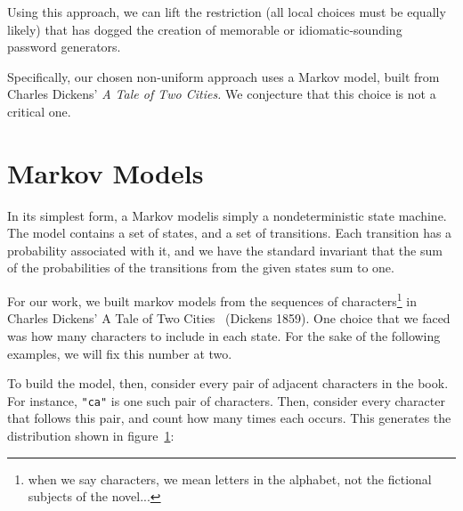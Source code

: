\documentclass[preprint]{soups}
\newcommand{\sectionNewpage}{}
\newcommand{\Scribtexttt}[1]{{\texttt{#1}}}
\let\SOriginalthesubsection\thesubsection
\newcommand{\Ssection}[2]{\section[#1]{#2}\let\thesubsection\SOriginalthesubsection}
\newcommand{\NoteBox}[1]{\footnote{#1}}
\newcommand{\NoteContent}[1]{#1}
\newcommand{\FigureRef}[2]{\hyperref[#2]{#1}}
\begin{document}
Using this approach, we can lift the restriction (all local
choices must be equally likely) that has dogged the creation
of memorable or idiomatic{-}sounding password generators.

Specifically, our chosen non{-}uniform approach uses a Markov
model, built from Charles Dickens{'} \textit{A Tale of Two
Cities.} We conjecture that this choice is not a critical
one.

\sectionNewpage

\Ssection{Markov Models}{Markov Models}\label{t:x28part_x22Markovx5fModelsx22x29}

In its simplest form, a Markov modelis simply a nondeterministic state machine. The model
contains a set of states, and a set of transitions. Each
transition has a probability associated with it, and we have
the standard invariant that the sum of the probabilities of
the transitions from the given states sum to one.

For our work, we built markov models from the sequences of
characters\NoteBox{\NoteContent{when we say characters, we mean letters in
the alphabet, not the fictional subjects of the novel...}}
in Charles Dickens{'} A Tale of Two Cities
~(Dickens 1859). One choice that we
faced was how many characters to include in each state. For
the sake of the following examples, we will fix this number
at two.

To build the model, then, consider every pair of adjacent
characters in the book. For instance, \Scribtexttt{"ca"} is one such
pair of characters. Then, consider every character that
follows this pair, and count how many times each occurs.
This generates the distribution shown in
figure~\FigureRef{1}{t:x28counter_x28x22figurex22_x22cax2dhistogramx22x29x29}:
\end{document}
